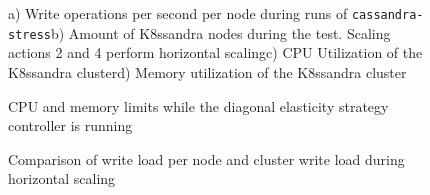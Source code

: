 \begin{figure}
    \centering
    
  \caption{a) Write operations per second per node during runs of \texttt{cassandra-stress}\qquad b) Amount of K8ssandra nodes during the test. Scaling actions 2 and 4 perform horizontal scaling\qquad c) CPU Utilization of the K8ssandra cluster\qquad d) Memory utilization of the K8ssandra cluster}
    \label{fig:diagonal-elasticity}
\end{figure}

\begin{figure}
    \centering
    
    \caption{CPU and memory limits while the diagonal elasticity strategy controller is running}
    \label{fig:diagonal-elasticity-limits}
\end{figure}

\begin{figure}
    \centering
    
    \caption{Comparison of write load per node and cluster write load during horizontal scaling}
    \label{fig:diagonal-elasticity_cluster-write-load}
\end{figure}
